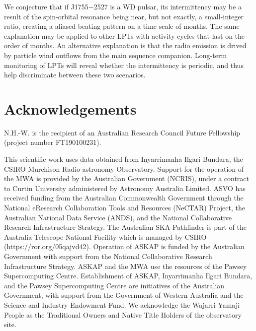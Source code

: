 \documentclass[fleqn,usenatbib]{mnras}
\newcommand{\src}{J1755$-$2527}
\begin{document}
We conjecture that if \src{} is a WD pulsar, its intermittency may be a result of the spin-orbital resonance being near, but not exactly, a small-integer ratio, creating a aliased beating pattern on a time scale of months.
The same explanation may be applied to other LPTs with activity cycles that last on the order of months.
An alternative explanation is that the radio emission is drived by particle wind outflows from the main sequence companion.
Long-term monitoring of LPTs will reveal whether the intermittency is periodic, and thus help discriminate between these two scenarios.

\section*{Acknowledgements}

N.H.-W. is the recipient of an Australian Research Council Future Fellowship (project number FT190100231).
 
 This scientific work uses data obtained from Inyarrimanha Ilgari Bundara, the CSIRO Murchison Radio-astronomy Observatory. Support for the operation of the MWA is provided by the Australian Government (NCRIS), under a contract to Curtin University administered by Astronomy Australia Limited. ASVO has received funding from the Australian Commonwealth Government through the National eResearch Collaboration Tools and Resources (NeCTAR) Project, the Australian National Data Service (ANDS), and the National Collaborative Research Infrastructure Strategy.
The Australian SKA Pathfinder is part of the Australia Telescope National Facility which is managed by CSIRO (https://ror.org/05qajvd42). Operation of ASKAP is funded by the Australian Government with support from the National Collaborative Research Infrastructure Strategy. ASKAP and the MWA use the resources of the Pawsey Supercomputing Centre. Establishment of ASKAP, Inyarrimanha Ilgari Bundara, and the Pawsey Supercomputing Centre are initiatives of the Australian Government, with support from the Government of Western Australia and the Science and Industry Endowment Fund. We acknowledge the Wajarri Yamaji People as the Traditional Owners and Native Title Holders of the observatory site.
\end{document}
